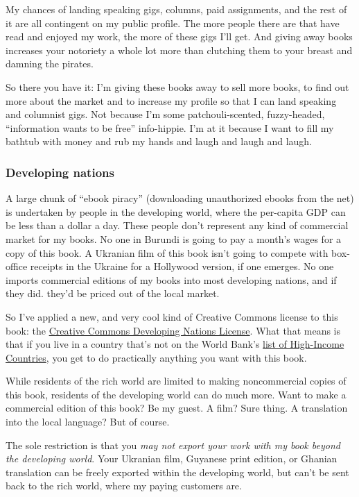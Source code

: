 My chances of landing speaking gigs, columns, paid assignments, and
the rest of it are all contingent on my public profile.  The more
people there are that have read and enjoyed my work, the more of these
gigs I'll get.  And giving away books increases your notoriety a whole
lot more than clutching them to your breast and damning the pirates.

So there you have it:  I'm giving these books away to sell more books,
to find out more about the market and to increase my profile so that I
can land speaking and columnist gigs.  Not because I'm some
patchouli-scented, fuzzy-headed, ``information wants to be free''
info-hippie.  I'm at it because I want to fill my bathtub with money
and rub my hands and laugh and laugh and laugh.


\subsubsection{Developing nations}

A large chunk of ``ebook piracy'' (downloading unauthorized ebooks
from the net) is undertaken by people in the developing world, where
the per-capita GDP can be less than a dollar a day.  These people
don't represent any kind of commercial market for my books.  No one in
Burundi is going to pay a month's wages for a copy of this book.  A
Ukranian film of this book isn't going to compete with box-office
receipts in the Ukraine for a Hollywood version, if one emerges.  No
one imports commercial editions of my books into most developing
nations, and if they did.  they'd be priced out of the local market. 

So I've applied a new, and very cool kind of Creative Commons license
to this book:  the 
\href{http://creativecommons.org/licenses/devnations/2.0/}{Creative
Commons Developing Nations License}.  What that means is that if
you live in a country that's not on the World Bank's
\href{http://rru.worldbank.org/DoingBusiness/\ldots \newline
  \ldots ExploreEconomies/EconomyCharacteristics.aspx}{list
of High-Income Countries}, you get to do practically anything you
want with this book.

While residents of the rich world are limited to making noncommercial
copies of this book, residents of the developing world can do much
more.  Want to make a commercial edition of this book?  Be my guest. 
A film?  Sure thing.  A translation into the local language?  But of
course.

The sole restriction is that you \textit{may not export your work with
my book beyond the developing world}.  Your Ukranian film, Guyanese
print edition, or Ghanian translation can be freely exported within
the developing world, but can't be sent back to the rich world, where
my paying customers are. 

